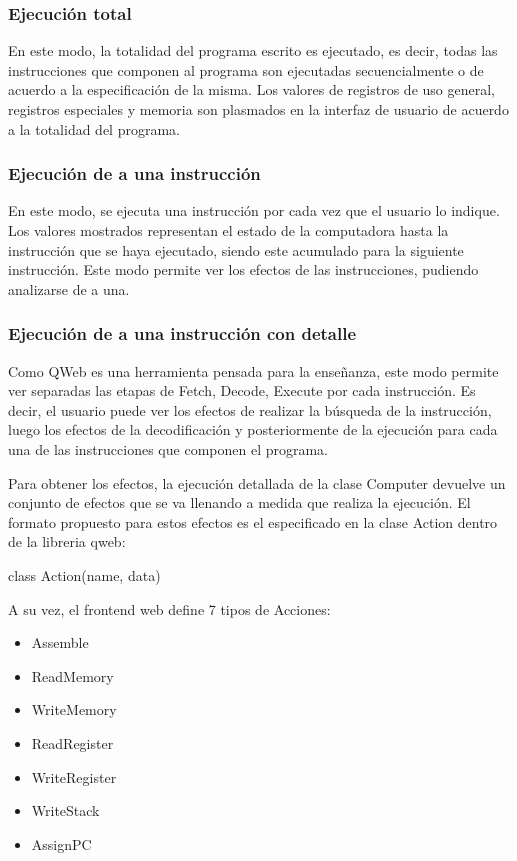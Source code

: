 \documentclass{article}
\begin{document}
\subsubsection*{Ejecución total}
En este modo, la totalidad del programa escrito es ejecutado, es decir, todas las instrucciones que componen al programa son ejecutadas secuencialmente o de acuerdo a la especificación de la misma. Los valores de registros de uso general, registros especiales y memoria son plasmados en la interfaz de usuario de acuerdo a la totalidad del programa.

\subsubsection*{Ejecución de a una instrucción}
En este modo, se ejecuta una instrucción por cada vez que el usuario lo indique. Los valores mostrados representan el estado de la computadora hasta la instrucción que se haya ejecutado, siendo este acumulado para la siguiente instrucción. Este modo permite ver los efectos de las instrucciones, pudiendo analizarse de a una.

\subsubsection*{Ejecución de a una instrucción con detalle}
Como QWeb es una herramienta pensada para la enseñanza, este modo permite ver separadas las etapas de Fetch, Decode, Execute por cada instrucción. Es decir, el usuario puede ver los efectos de realizar la búsqueda de la instrucción, luego los efectos de la decodificación y posteriormente de la ejecución para cada una de las instrucciones que componen el programa.

Para obtener los efectos, la ejecución detallada de la clase Computer devuelve un conjunto de efectos que se va llenando a medida que realiza la ejecución. El formato propuesto para estos efectos es el especificado en la clase Action dentro de la libreria qweb: 

\begin{center}
class Action(name, data)
\end{center}

A su vez, el frontend web define 7 tipos de Acciones: 
\begin{itemize}
\item Assemble
\item ReadMemory
\item WriteMemory
\item ReadRegister
\item WriteRegister
\item WriteStack
\item AssignPC
\end{itemize}
\end{document}

